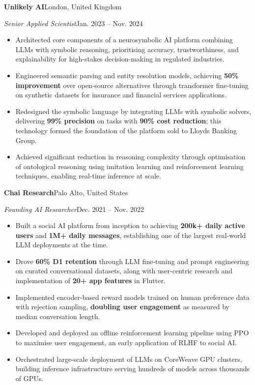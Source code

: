 \documentclass[10pt,a4paper]{article}
\newcommand{\experience}[4]{%
    \textbf{#1}\hfill #2\par\vspace{-0.5\baselineskip}%
    \textit{#3}\hfill #4\par\vspace{-0.5\baselineskip}%
}
\begin{document}
\experience{Unlikely AI}{London, United Kingdom}
{Senior Applied Scientist}{Jan. 2023 -- Nov. 2024}
\begin{itemize}
    \item Architected core components of a neurosymbolic AI platform combining LLMs with symbolic reasoning, prioritising accuracy, trustworthiness, and explainability for high-stakes decision-making in regulated industries.
    \item Engineered semantic parsing and entity resolution models, achieving \textbf{50\% improvement} over open-source alternatives through transformer fine-tuning on synthetic datasets for insurance and financial services applications.
    \item Redesigned the symbolic language by integrating LLMs with symbolic solvers, delivering \textbf{99\% precision} on tasks with \textbf{90\% cost reduction}; this technology formed the foundation of the platform sold to Lloyds Banking Group.
    \item Achieved significant reduction in reasoning complexity through optimisation of ontological reasoning using imitation learning and reinforcement learning techniques, enabling real-time inference at scale.
\end{itemize}

\experience{Chai Research}{Palo Alto, United States}
{Founding AI Researcher}{Dec. 2021 -- Nov. 2022}
\begin{itemize}
    \item Built a social AI platform from inception to achieving \textbf{200k+ daily active users} and \textbf{1M+ daily messages}, establishing one of the largest real-world LLM deployments at the time.
    \item Drove \textbf{60\% D1 retention} through LLM fine-tuning and prompt engineering on curated conversational datasets, along with user-centric research and implementation of \textbf{20+ app features} in Flutter.
    \item Implemented encoder-based reward models trained on human preference data with rejection sampling, \textbf{doubling user engagement} as measured by median conversation length.
    \item Developed and deployed an offline reinforcement learning pipeline using PPO to maximise user engagement, an early application of RLHF to social AI.
    \item Orchestrated large-scale deployment of LLMs on CoreWeave GPU clusters, building inference infrastructure serving hundreds of models across thousands of GPUs.
\end{itemize}
\end{document}
